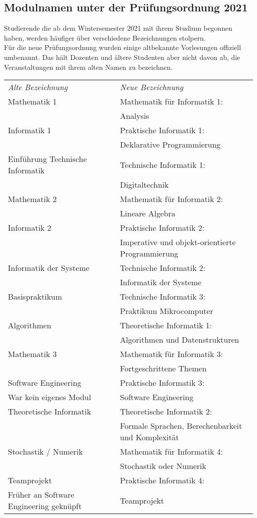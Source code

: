 \subsection*{Modulnamen unter der Prüfungsordnung 2021}
Studierende die ab dem Wintersemester 2021 mit ihrem Studium begonnen haben,
werden häufiger über verschiedene Bezeichnungen stolpern.\\
Für die neue Prüfungsordnung wurden einige altbekannte Vorlesungen offiziell
umbenannt. Das hält Dozenten und ältere Studenten aber nicht davon ab, die
Veranstaltungen mit ihrem alten Namen zu bezeichnen.

\begin{tabular}{ll}
\emph{Alte Bezeichnung}						& \emph{Neue Bezeichnung} \\[.7em]
Mathematik 1											& Mathematik für Informatik 1: \\
																	& Analysis \\[.7em]
Informatik 1										  & Praktische Informatik 1: \\
																	& Deklarative Programmierung \\[.7em]
Einführung Technische Informatik  & Technische Informatik 1: \\
																	& Digitaltechnik \\[.7em]
Mathematik 2											& Mathematik für Informatik 2: \\
																	& Lineare Algebra \\[.7em]
Informatik 2											& Praktische Informatik 2: \\
																	& Imperative und objekt-orientierte Programmierung \\[.7em]
Informatik der Systeme						& Technische Informatik 2: \\
																	& Informatik der Systeme \\[.7em]
Basispraktikum										& Technische Informatik 3: \\
																	&	Praktikum Mikrocomputer \\[.7em]
Algorithmen												& Theoretische Informatik 1: \\
																	& Algorithmen und Datenstrukturen \\[.7em]
Mathematik 3											& Mathematik für Informatik 3: \\
																	& Fortgeschrittene Themen \\[.7em]
Software Engineering							& Praktische Informatik 3: \\
\footnotesize{War kein eigenes Modul}		& Software Engineering \\[.7em]
Theoretische Informatik						& Theoretische Informatik 2: \\
																	& Formale Sprachen, Berechenbarkeit und Komplexität \\[.7em]
Stochastik / Numerik							& Mathematik für Informatik 4: \\
																	& Stochastik oder Numerik \\[.7em]
Teamprojekt												& Praktische Informatik 4: \\
\footnotesize{Früher an Software Engineering geknüpft} & Teamprojekt
\end{tabular}

